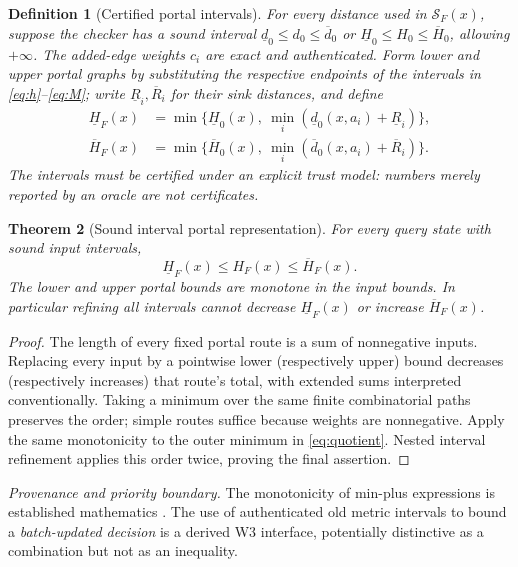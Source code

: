 \documentclass[11pt,letterpaper]{article}
\newtheorem{theorem}{Theorem}[section]
\newtheorem{definition}[theorem]{Definition}
\newcommand{\INF}{+\infty}
\newcommand{\attrib}[1]{\par\noindent\textit{Provenance and priority boundary.} #1\par}
\begin{document}
\begin{definition}[Certified portal intervals]
For every distance used in $\mathcal S_F(x)$, suppose the checker has a sound interval $\underline d_0\le d_0\le\overline d_0$ or $\underline H_0\le H_0\le\overline H_0$, allowing $\INF$. The added-edge weights $c_i$ are exact and authenticated. Form lower and upper portal graphs by substituting the respective endpoints of the intervals in \eqref{eq:h}--\eqref{eq:M}; write $\underline R_i,\overline R_i$ for their sink distances, and define
\begin{align*}
\underline H_F(x)&=\min\bigl\{\underline H_0(x),\ \min_i(\underline d_0(x,a_i)+\underline R_i)\bigr\},\\
\overline H_F(x)&=\min\bigl\{\overline H_0(x),\ \min_i(\overline d_0(x,a_i)+\overline R_i)\bigr\}.
\end{align*}
The intervals must be \emph{certified} under an explicit trust model: numbers merely reported by an oracle are not certificates.
\end{definition}
\begin{theorem}[Sound interval portal representation]\label{thm:interval}
For every query state with sound input intervals,
\[
\boxed{\underline H_F(x)\le H_F(x)\le\overline H_F(x).}
\]
The lower and upper portal bounds are monotone in the input bounds. In particular refining all intervals cannot decrease $\underline H_F(x)$ or increase $\overline H_F(x)$.
\end{theorem}
\begin{proof}
The length of every fixed portal route is a sum of nonnegative inputs. Replacing every input by a pointwise lower (respectively upper) bound decreases (respectively increases) that route's total, with extended sums interpreted conventionally. Taking a minimum over the same finite combinatorial paths preserves the order; simple routes suffice because weights are nonnegative. Apply the same monotonicity to the outer minimum in \eqref{eq:quotient}. Nested interval refinement applies this order twice, proving the final assertion.
\end{proof}
\attrib{The monotonicity of min-plus expressions is established mathematics \cite{Mohri,Bellman}. The use of authenticated old metric intervals to bound a \emph{batch-updated decision} is a derived W3 interface, potentially distinctive as a combination but not as an inequality.}
\end{document}
